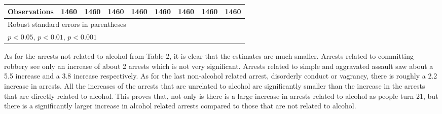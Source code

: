\documentclass[a4paper]{article}
\begin{document}
\begin{table}[H]
{\begin{tabular}{l*{8}{c}}
\hline
Observations        &        1460         &        1460         &        1460         &        1460         &        1460         &        1460         &        1460         &        1460         \\
\hline\hline
\multicolumn{9}{l}{\footnotesize Robust standard errors in parentheses}\\
\multicolumn{9}{l}{\footnotesize \sym{*} \(p<0.05\), \sym{**} \(p<0.01\), \sym{***} \(p<0.001\)}\\
\end{tabular}}
   
    \label{tab:my_label}
\end{table}

\par
As for the arrests not related to alcohol from Table 2, it is clear that the estimates are much smaller. Arrests related to committing robbery see only an increase of about 2 arrests which is not very significant. Arrests related to simple and aggravated assault saw about a 5.5 increase and a 3.8 increase respectively. As for the last non-alcohol related arrest, disorderly conduct or vagrancy, there is roughly a 2.2 increase in arrests. All the increases of the arrests that are unrelated to alcohol are significantly smaller than the increase in the arrests that are directly related to alcohol. This proves that, not only is there is a large increase in arrests related to alcohol as people turn 21, but there is a significantly larger increase in alcohol related arrests compared to those that are not related to alcohol. 
\end{document}
